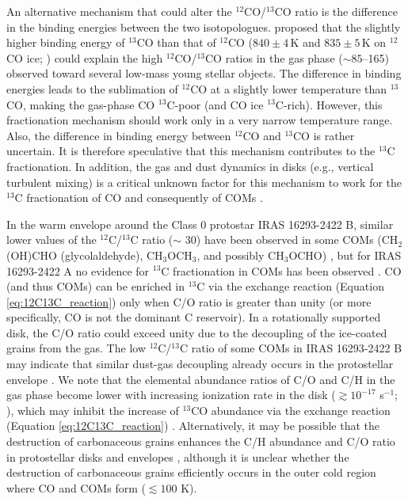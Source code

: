 \documentclass[twocolumn, twocolappendix, astrosymb, times]{aastex631}
\newcommand{\methylformate}{CH$_3$OCHO\xspace}
\newcommand{\dimethylether}{CH$_3$OCH$_3$\xspace}
\begin{document}
An alternative mechanism that could alter the $^{12}$CO/$^{13}$CO ratio is the difference in the binding energies between the two isotopologues. \citet{Smith2015} proposed that the slightly higher binding energy of $^{13}$CO than that of $^{12}$CO ($840\pm4$\,K and $835\pm5$\,K on $^{12}$CO ice; \citealt{Smith2021}) could explain the high $^{12}$CO/$^{13}$CO ratios in the gas phase ($\sim85$--165) observed toward several low-mass young stellar objects. The difference in binding energies leads to the sublimation of $^{12}$CO at a slightly lower temperature than $^{13}$CO, making the gas-phase CO $^{13}$C-poor (and CO ice $^{13}$C-rich). However, this fractionation mechanism should work only in a very narrow temperature range. Also, the difference in binding energy between $^{12}$CO and $^{13}$CO is rather uncertain. It is therefore speculative that this mechanism contributes to the $^{13}$C fractionation. In addition, the gas and dust dynamics in disks (e.g., vertical turbulent mixing) is a critical unknown factor for this mechanism to work for the $^{13}$C fractionation of CO and consequently of COMs \citep[e.g.,][]{Yoshida2022_12CO13CO}.


In the warm envelope around the Class 0 protostar IRAS 16293-2422 B, similar lower values of the $^{12}$C/$^{13}$C ratio ($\sim$ 30) have been observed in some COMs (CH$_2$(OH)CHO (glycolaldehyde), \dimethylether, and possibly \methylformate) \citep[see Table \ref{tab:12C13C_summary};][]{Jorgensen2016, Jorgensen2018}, but for IRAS 16293-2422 A no evidence for $^{13}$C fractionation in COMs has been observed \citep[Table \ref{tab:12C13C_summary};][]{Manigand2020}. CO (and thus COMs) can be enriched in $^{13}$C via the exchange reaction (Equation \ref{eq:12C13C_reaction}) only when C/O ratio is greater than unity (or more specifically, CO is not the dominant C reservoir). In a rotationally supported disk, the C/O ratio could exceed unity due to the decoupling of the ice-coated grains from the gas. The low $^{12}$C/$^{13}$C ratio of some COMs in IRAS 16293-2422 B may indicate that similar dust-gas decoupling already occurs in the protostellar envelope \citep[e.g.,][]{Koga2022}. 
We note that the elemental abundance ratios of C/O and C/H in the gas phase become lower with increasing ionization rate in the disk ($\gtrsim10^{-17}$ s$^{-1}$; \citealt{Eistrup2016, Schwarz2018, Notsu2020}), which may inhibit the increase of $^{13}$CO abundance via the exchange reaction (Equation \ref{eq:12C13C_reaction}) \citep{Woods2009}. Alternatively, it may be possible that the destruction of carbonaceous grains enhances the C/H abundance and C/O ratio in protostellar disks and envelopes \citep[e.g.,][]{Wei2019, vantHoff2020}, although it is unclear whether the destruction of carbonaceous grains efficiently occurs in the outer cold region where CO and COMs form ($\lesssim100$ K).
\end{document}
